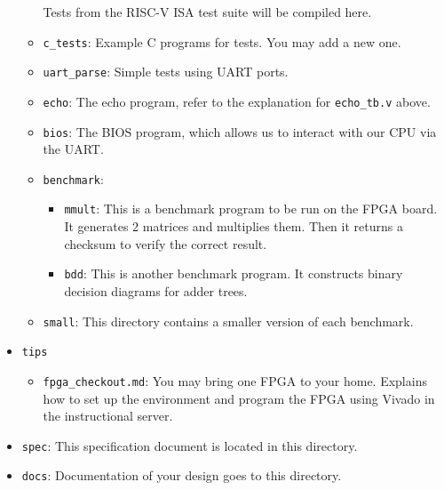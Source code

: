 \begin{itemize}
\begin{itemize}
    Tests from the RISC-V ISA test suite will be compiled here.
  \item \verb|c_tests|:
    Example C programs for tests.
    You may add a new one.
  \item \verb|uart_parse|:
    Simple tests using UART ports.
  \item \verb|echo|:
    The echo program, refer to the explanation for \verb|echo_tb.v| above.
  \item \verb|bios|:
    The BIOS program, which allows us to interact with our CPU via the UART.
  \item \verb|benchmark|:
    \begin{itemize}
    \item \verb|mmult|:
      This is a benchmark program to be run on the FPGA board.
      It generates 2 matrices and multiplies them.
      Then it returns a checksum to verify the correct result.
    \item \verb|bdd|:
      This is another benchmark program.
      It constructs binary decision diagrams for adder trees.
    \end{itemize}
  \item \verb|small|:
    This directory contains a smaller version of each benchmark.
  \end{itemize}
\item \verb|tips|
  \begin{itemize}
  \item \verb|fpga_checkout.md|:
    You may bring one FPGA to your home.
    Explains how to set up the environment and program the FPGA using Vivado in the instructional server.
  \end{itemize}
\item \verb|spec|:
  This specification document is located in this directory.
\item \verb|docs|:
  Documentation of your design goes to this directory.
\end{itemize}

\newpage
